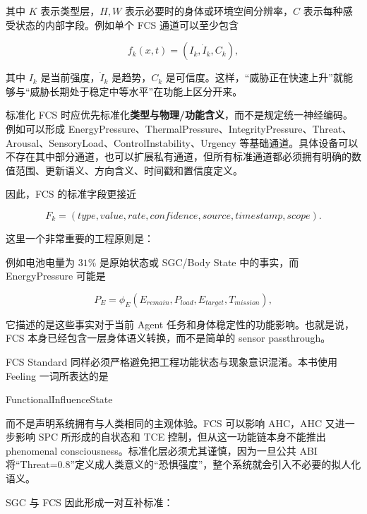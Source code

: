 其中 $K$ 表示类型层，$H,W$ 表示必要时的身体或环境空间分辨率，$C$ 表示每种感受状态的内部字段。例如单个 FCS 通道可以至少包含

\[
f_k(x,t)
=
\left(
I_k,
\dot I_k,
C_k
\right),
\]

其中 $I_k$ 是当前强度，$\dot I_k$ 是趋势，$C_k$ 是可信度。这样，``威胁正在快速上升''就能够与``威胁长期处于稳定中等水平''在功能上区分开来。

标准化 FCS 时应优先标准化\textbf{类型与物理/功能含义}，而不是规定统一神经编码。例如可以形成 EnergyPressure、ThermalPressure、IntegrityPressure、Threat、Arousal、SensoryLoad、ControlInstability、Urgency 等基础通道。具体设备可以不存在其中部分通道，也可以扩展私有通道，但所有标准通道都必须拥有明确的数值范围、更新语义、方向含义、时间戳和置信度定义。

因此，FCS 的标准字段更接近

\[
F_k=
(
type,
value,
rate,
confidence,
source,
timestamp,
scope
).
\]

这里一个非常重要的工程原则是：

\begin{statementbox}
\centering
{}
\end{statementbox}

例如电池电量为 $31\%$ 是原始状态或 SGC/Body State 中的事实，而 EnergyPressure 可能是

\[
P_E
=
\phi_E
(
E_{remain},
P_{load},
E_{target},
T_{mission}
),
\]

它描述的是这些事实对于当前 Agent 任务和身体稳定性的功能影响。也就是说，FCS 本身已经包含一层身体语义转换，而不是简单的 sensor passthrough。

FCS Standard 同样必须严格避免把工程功能状态与现象意识混淆。本书使用 Feeling 一词所表达的是

\begin{statementbox}
FunctionalInfluenceState
\end{statementbox}

而不是声明系统拥有与人类相同的主观体验。FCS 可以影响 AHC，AHC 又进一步影响 SPC 所形成的自状态和 TCE 控制，但从这一功能链本身不能推出 phenomenal consciousness。标准化层必须尤其谨慎，因为一旦公共 ABI 将``Threat=0.8''定义成人类意义的``恐惧强度''，整个系统就会引入不必要的拟人化语义。

SGC 与 FCS 因此形成一对互补标准：

\begin{statementbox}
\centering
{}
\end{statementbox}

